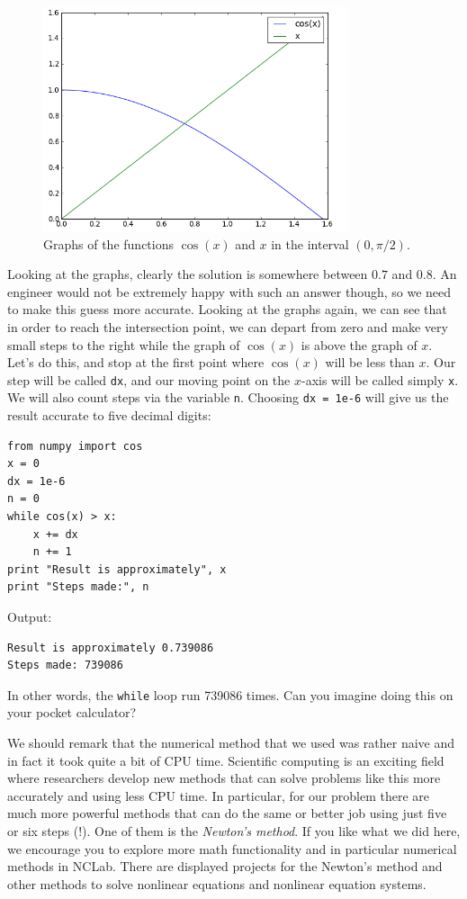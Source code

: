 \begin{figure}[!ht]
\begin{center}
\includegraphics[width=0.8\textwidth]{imgp/xcosx.png}
\end{center}
\vspace{-2mm}
\caption{Graphs of the functions $\cos(x)$ and $x$ in the interval $(0, \pi/2)$.}
\label{fig:xcosx}
\end{figure}
\noindent
Looking at the graphs, clearly the solution is somewhere 
between $0.7$ and $0.8$. 
An engineer would not be extremely happy with such an answer though, 
so we need to make this guess more accurate. Looking at the graphs again, we can see
that in order to reach the intersection point, we can depart from zero and make very 
small steps to the right while the graph of $\cos(x)$ is above the graph of $x$.
Let's do this, and stop 
at the first point where $\cos(x)$ will be less than $x$. Our step will be called {\tt dx},
and our moving point on the $x$-axis will be called simply {\tt x}. We will also count 
steps via the variable {\tt n}. Choosing {\tt dx = 1e-6} will give us the result accurate 
to five decimal digits:

\begin{verbatim}
from numpy import cos
x = 0
dx = 1e-6
n = 0
while cos(x) > x:
    x += dx
    n += 1
print "Result is approximately", x
print "Steps made:", n
\end{verbatim}
Output:

\begin{verbatim}
Result is approximately 0.739086
Steps made: 739086
\end{verbatim}
In other words, the {\tt while} loop run 739086 times. Can you 
imagine doing this on your pocket calculator?

We should remark that the numerical method that we used was rather 
naive and in fact it took quite a bit of CPU time. Scientific computing
is an exciting field where researchers develop new methods that 
can solve problems like this more accurately and using less CPU time. 
In particular, for our problem there are much more powerful methods that can do the
same or better job using just five or six steps (!). One of them 
is the {\em Newton's method}. If you like what we did here, we encourage 
you to explore more math functionality and in particular numerical 
methods in NCLab. There are displayed projects for the Newton's method
and other methods to solve nonlinear equations and nonlinear equation systems.




